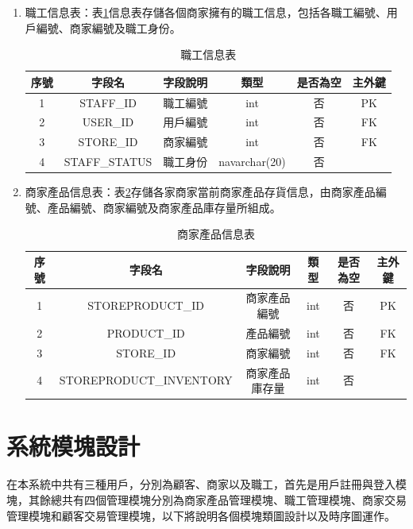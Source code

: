 \begin{enumerate}
		\item 職工信息表：表\ref{staff}信息表存儲各個商家擁有的職工信息，包括各職工編號、用戶編號、商家編號及職工身份。
				\begin{table}[!htbp]
				\centering
				\caption{職工信息表}
				\label{staff}
				\begin{tabular}{|c|c|c|c|c|c|}
				\hline
				序號 & 字段名 & 字段說明 & 類型 & 是否為空 & 主外鍵 \\ \hline
				1 & STAFF\_ID & 職工編號 & int & 否 & PK \\ \hline
				2 & USER\_ID & 用戶編號 & int & 否 & FK \\ \hline
				3 & STORE\_ID & 商家編號 & int & 否 & FK \\ \hline
				4 & STAFF\_STATUS & 職工身份 & navarchar(20) & 否 &  \\ \hline
				\end{tabular}
				\end{table}

		\item 商家產品信息表：表\ref{storeproduct}存儲各家商家當前商家產品存貨信息，由商家產品編號、產品編號、商家編號及商家產品庫存量所組成。
				\begin{table}[!htbp]
				\centering
				\caption{商家產品信息表}
				\label{storeproduct}
				\begin{tabular}{|c|c|c|c|c|c|}
				\hline
				序號 & 字段名 & 字段說明 & 類型 & 是否為空 & 主外鍵 \\ \hline
				1 & STOREPRODUCT\_ID & 商家產品編號 & int & 否 & PK \\ \hline
				2 & PRODUCT\_ID & 產品編號 & int & 否 & FK \\ \hline
				3 & STORE\_ID & 商家編號 & int & 否 & FK \\ \hline
				4 & STOREPRODUCT\_INVENTORY & 商家產品庫存量 & int & 否 &  \\ \hline
				\end{tabular}
				\end{table}

	\end{enumerate}

\section{系統模塊設計}
在本系統中共有三種用戶，分別為顧客、商家以及職工，首先是用戶註冊與登入模塊，其餘總共有四個管理模塊分別為商家產品管理模塊、職工管理模塊、商家交易管理模塊和顧客交易管理模塊，以下將說明各個模塊類圖設計以及時序圖運作。


